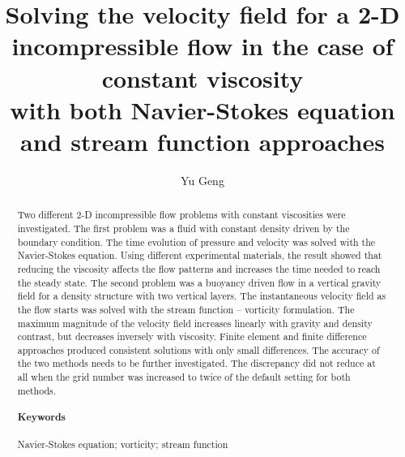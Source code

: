 \documentclass[11pt]{article}
\title{\textbf{Solving the velocity field for a 2-D incompressible flow in the case of constant viscosity\\with both Navier-Stokes equation and stream function approaches}}
\author{Yu Geng}
\date{}
\numberwithin{figure}{section}  %
\numberwithin{equation}{section}  %
\begin{document}
\maketitle
\begin{abstract}
	Two different 2-D incompressible flow problems with constant viscosities were investigated. The first problem was a fluid with constant density driven by the boundary condition. The time evolution of pressure and velocity was solved with the Navier-Stokes equation. Using different experimental materials, the result showed that reducing the viscosity affects the flow patterns and increases the time needed to reach the steady state. The second problem was a buoyancy driven flow in a vertical gravity field for a density structure with two vertical layers. The instantaneous velocity field as the flow starts was solved with the stream function – vorticity formulation. The maximum magnitude of the velocity field increases linearly with gravity and density contrast, but decreases inversely with viscosity. Finite element and finite difference approaches produced consistent solutions with only small differences. The accuracy of the two methods needs to be further investigated. The discrepancy did not reduce at all when the grid number was increased to twice of the default setting for both methods.
	\paragraph{Keywords}Navier-Stokes equation; vorticity; stream function
\end{abstract}
\newpage

\tableofcontents
\newpage
{}
\end{document}
